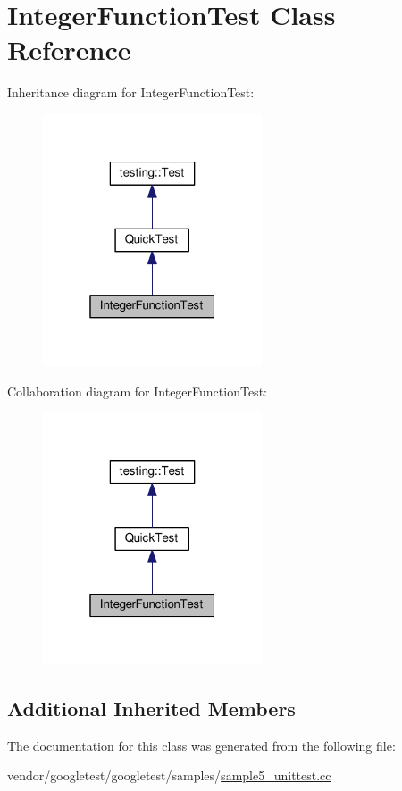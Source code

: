 \hypertarget{classIntegerFunctionTest}{}\section{Integer\+Function\+Test Class Reference}
\label{classIntegerFunctionTest}


Inheritance diagram for Integer\+Function\+Test\+:\nopagebreak
\begin{figure}[H]
\begin{center}
\leavevmode
\includegraphics[width=184pt]{classIntegerFunctionTest__inherit__graph}
\end{center}
\end{figure}


Collaboration diagram for Integer\+Function\+Test\+:\nopagebreak
\begin{figure}[H]
\begin{center}
\leavevmode
\includegraphics[width=184pt]{classIntegerFunctionTest__coll__graph}
\end{center}
\end{figure}
\subsection*{Additional Inherited Members}


The documentation for this class was generated from the following file\+:\begin{DoxyCompactItemize}
\item 
vendor/googletest/googletest/samples/\hyperlink{sample5__unittest_8cc}{sample5\+\_\+unittest.\+cc}\end{DoxyCompactItemize}
